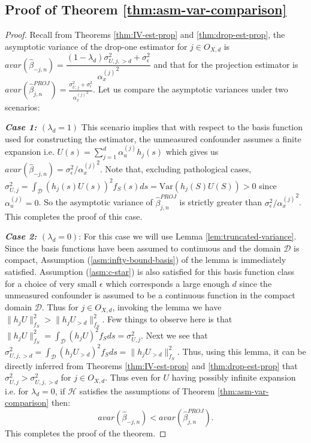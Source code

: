 \documentclass[
  12pt]{article}
\newcommand{\calD}{\mathcal{D}}
\newcommand{\calH}{\mathcal{H}}
\begin{document}
\subsection{Proof of Theorem \ref{thm:asm-var-comparison}}\label{thm:asm-var-comparison-proof}
\begin{proof}
Recall from Theorems \ref{thm:IV-est-prop} and \ref{thm:drop-est-prop}, the asymptotic variance of the drop-one 
estimator for $j \in O_{X,d}$ is $avar\left(\hat{\beta}_{-j,n}\right)=\dfrac{(1-\lambda_{d})\sigma^2_{U,j,>d} + \sigma^2_\epsilon}{{\alpha_x^{(j)}}^2}$ and that for the projection estimator is $avar\left(\hat{\beta}^{PROJ}_{j,n}\right)=\frac{\sigma^2_{U,j}+ \sigma^2_\epsilon}{{\alpha_x^{(j)}}^2}$. Let us compare the asymptotic variances under two scenarios:

\textbf{\textit{Case 1: $(\lambda_d = 1)$}} This scenario implies that with respect to the basis function used for constructing the estimator, the unmeasured confounder assumes a finite expansion i.e. $ U(s) = \sum_{j=1}^d\alpha_u^{(j)}h_j(s)$ which gives us $avar\left(\hat{\beta}_{-j,n}\right) = \sigma^2_\epsilon/{{\alpha_x^{(j)}}^2}$. Note that, excluding pathological cases, $\sigma^2_{U,j}=\int_\calD (h_j(s)U(s))^2f_S(s)ds  = \text{Var}(h_j(S)U(S)) > 0$ since $\alpha_u^{(j)}=0$. So the asymptotic variance of $\hat{\beta}_{j,n}^{PROJ}$ is strictly greater than $\sigma^2_\epsilon/{\alpha_x^{(j)}}^2$. This completes the proof of this case.


\textbf{\textit{Case 2: $(\lambda_d = 0)$}}: For this case we will use Lemma \ref{lem:truncated-variance}. Since the basis functions have been assumed to continuous and the domain $\calD$ is compact, Assumption (\ref{asm:infty-bound-basis}) of the lemma is immediately satisfied. Assumption (\ref{asm:c-star}) is also satisfied for this basis function class for a choice of very small $\epsilon$ which corresponds a large enough $d$ since the unmeasured confounder is assumed to be a continuous function in the compact domain $\calD$. Thus for $j \in O_{X,d}$, invoking the lemma we have $\|h_j U\|^2_{f_S} > \|h_j U_{>d}\|^2_{f_S}$. Few things to observe here is that $\|h_j U\|^2_{f_S} = \int_\calD (h_jU)^2f_Sds = \sigma^2_{U,j}$. Next we see that $\sigma^2_{U,j,>d} = \int_\calD(h_j U_{>d})^2f_Sds= \|h_j U_{>d}\|^2_{f_S}$. Thus, using this lemma, it can be directly inferred from Theorems \ref{thm:IV-est-prop} and \ref{thm:drop-est-prop} that $\sigma^2_{U,j} > \sigma^2_{U,j,>d}$ for $j \in O_{X,d}$. Thus even for $U$ having possibly infinite expansion i.e. for $\lambda_{d} = 0$, if $\calH$ satisfies the assumptions of Theorem \ref{thm:asm-var-comparison} then:
$$ avar\left(\hat{\beta}_{-j,n}\right)
< avar\left(\hat{\beta}^{PROJ}_{j,n}\right).$$
This completes the proof of the theorem.   
\end{proof}
\end{document}
